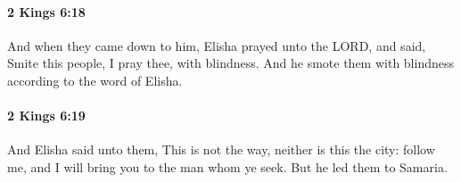 		\paragraph{2 Kings 6:18} %
			\label{2KINGS-6-18}

			And when they came down to him, Elisha prayed unto the LORD, and said, Smite this people, I pray thee, with blindness. And he smote them with blindness according to the word of Elisha.


		\paragraph{2 Kings 6:19} %
			\label{2KINGS-6-19}

			And Elisha said unto them, This is not the way, neither is this the city: follow me, and I will bring you to the man whom ye seek. But he led them to Samaria.


